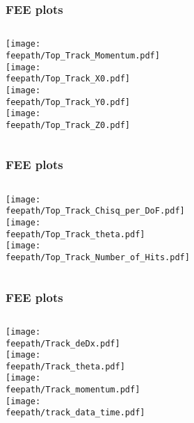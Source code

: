 \documentclass{beamer}
\newcommand{\feepath}{/Users/pbutti/sw/hps-java-validation/analysis/fee_2016_validation}
\begin{document}
\begin{frame}
\frametitle{FEE plots}
\begin{columns}[c]
\texttt{[image: \\feepath/Top\_Track\_Momentum.pdf]}\\
\texttt{[image: \\feepath/Top\_Track\_X0.pdf]}\\
\texttt{[image: \\feepath/Top\_Track\_Y0.pdf]}\\
\texttt{[image: \\feepath/Top\_Track\_Z0.pdf]}\\
\end{columns}
\end{frame}

\begin{frame}
\frametitle{FEE plots}
\begin{columns}[c]
\texttt{[image: \\feepath/Top\_Track\_Chisq\_per\_DoF.pdf]}\\
\texttt{[image: \\feepath/Top\_Track\_theta.pdf]}\\
\texttt{[image: \\feepath/Top\_Track\_Number\_of\_Hits.pdf]}\\
\end{columns}
\end{frame}


\begin{frame}
\frametitle{FEE plots}
\begin{columns}[c]
\texttt{[image: \\feepath/Track\_deDx.pdf]}\\
\texttt{[image: \\feepath/Track\_theta.pdf]}\\
\texttt{[image: \\feepath/Track\_momentum.pdf]}\\
\texttt{[image: \\feepath/track\_data\_time.pdf]}\\
\end{columns}
\end{frame}
\end{document}
